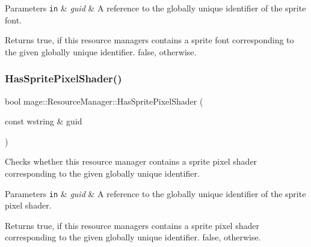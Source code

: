 \begin{DoxyParams}[1]{Parameters}
\mbox{\tt in}  & {\em guid} & A reference to the globally unique identifier of the sprite font. \\
\hline
\end{DoxyParams}
\begin{DoxyReturn}{Returns}
{\ttfamily true}, if this resource managers contains a sprite font corresponding to the given globally unique identifier. {\ttfamily false}, otherwise. 
\end{DoxyReturn}
\hypertarget{classmage_1_1_resource_manager_ae1a4a3a8d98ecbf3c585464d0edd0c9f}{}\label{classmage_1_1_resource_manager_ae1a4a3a8d98ecbf3c585464d0edd0c9f} 
\subsubsection{\texorpdfstring{Has\+Sprite\+Pixel\+Shader()}{HasSpritePixelShader()}}
{\footnotesize\ttfamily bool mage\+::\+Resource\+Manager\+::\+Has\+Sprite\+Pixel\+Shader (\begin{DoxyParamCaption}\item[{const wstring \&}]{guid }\end{DoxyParamCaption})\hspace{0.3cm}{\ttfamily [noexcept]}}

Checks whether this resource manager contains a sprite pixel shader corresponding to the given globally unique identifier.


\begin{DoxyParams}[1]{Parameters}
\mbox{\tt in}  & {\em guid} & A reference to the globally unique identifier of the sprite pixel shader. \\
\hline
\end{DoxyParams}
\begin{DoxyReturn}{Returns}
{\ttfamily true}, if this resource managers contains a sprite pixel shader corresponding to the given globally unique identifier. {\ttfamily false}, otherwise. 
\end{DoxyReturn}
\hypertarget{classmage_1_1_resource_manager_a03b2fd29460628ae0be3ec634c9a9683}{}\label{classmage_1_1_resource_manager_a03b2fd29460628ae0be3ec634c9a9683} 
